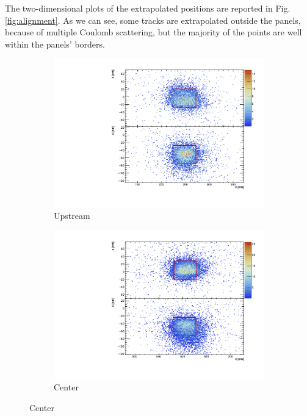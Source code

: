 \documentclass[a4paper]{scrartcl}
\begin{document}
The two-dimensional plots of the extrapolated positions are reported in Fig. \ref{fig:alignment}. As we can see, some tracks are extrapolated outside the panels, because of multiple Coulomb scattering, but the majority of the points are well within the panels' borders.

\begin{figure}[htbp]
  \begin{subfigure}{0.32\textwidth}
    \includegraphics[width=\linewidth]{figures/upstream.pdf}
    \caption{Upstream} \label{fig:upstream_align}
  \end{subfigure}
  \begin{subfigure}{0.32\textwidth}
    \includegraphics[width=\linewidth]{figures/centre.pdf}
    \caption{Center} \label{fig:centre_align}
  \end{subfigure}

\end{figure}
\end{document}
